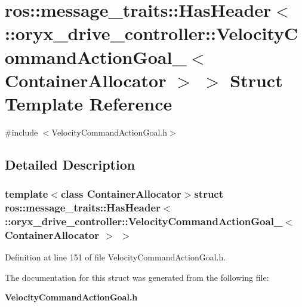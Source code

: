 \section{ros\-:\-:message\-\_\-traits\-:\-:\-Has\-Header$<$ \-:\-:oryx\-\_\-drive\-\_\-controller\-:\-:\-Velocity\-Command\-Action\-Goal\-\_\-$<$ \-Container\-Allocator $>$ $>$ \-Struct \-Template \-Reference}
\label{structros_1_1message__traits_1_1HasHeader_3_01_1_1oryx__drive__controller_1_1VelocityCommandActi05c4999b0a49f31ae2d81a2d3b68504b}


{\ttfamily \#include $<$\-Velocity\-Command\-Action\-Goal.\-h$>$}



\subsection{\-Detailed \-Description}
\subsubsection*{template$<$class Container\-Allocator$>$struct ros\-::message\-\_\-traits\-::\-Has\-Header$<$ \-::oryx\-\_\-drive\-\_\-controller\-::\-Velocity\-Command\-Action\-Goal\-\_\-$<$ Container\-Allocator $>$ $>$}



\-Definition at line 151 of file \-Velocity\-Command\-Action\-Goal.\-h.



\-The documentation for this struct was generated from the following file\-:\begin{DoxyCompactItemize}
\item 
{\bf \-Velocity\-Command\-Action\-Goal.\-h}\end{DoxyCompactItemize}
